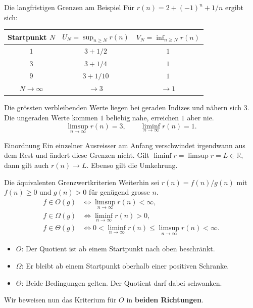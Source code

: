 \begin{frame}{Die langfristigen Grenzen am Beispiel}
	Für $r(n)=2+(-1)^n+1/n$ ergibt sich:
	\begin{center}
		\begin{tabular}{c|c|c}
			Startpunkt $N$ & $U_N=\sup_{n\geq N}r(n)$ & $V_N=\inf_{n\geq N}r(n)$\\
			\hline
			$1$ & $3+1/2$ & $1$\\
			$3$ & $3+1/4$ & $1$\\
			$9$ & $3+1/10$ & $1$\\
			$N\to\infty$ & $\longrightarrow 3$ & $\longrightarrow 1$
		\end{tabular}
	\end{center}
	\smallskip
	Die grössten verbleibenden Werte liegen bei geraden Indizes und nähern sich $3$. Die ungeraden Werte kommen $1$ beliebig nahe, erreichen $1$ aber nie.
	\[
		\limsup_{n\to\infty}r(n)=3,\qquad \liminf_{n\to\infty}r(n)=1.
	\]
	\begin{block}{Einordnung}
		Ein einzelner Ausreisser am Anfang verschwindet irgendwann aus dem Rest und ändert diese Grenzen nicht. Gilt $\liminf r=\limsup r=L\in\mathbb{R}$, dann gilt auch $r(n)\to L$. Ebenso gilt die Umkehrung.
	\end{block}
\end{frame}

\begin{frame}{Die äquivalenten Grenzwertkriterien}
	Weiterhin sei $r(n)=f(n)/g(n)$ mit $f(n)\geq 0$ und $g(n)>0$ für genügend grosse $n$.
	\begin{align*}
		f\in O(g) &\iff \limsup_{n\to\infty}r(n)<\infty,\\[0.5em]
		f\in\Omega(g) &\iff \liminf_{n\to\infty}r(n)>0,\\[0.5em]
		f\in\Theta(g) &\iff 0<\liminf_{n\to\infty}r(n)
		\leq\limsup_{n\to\infty}r(n)<\infty.
	\end{align*}
	\begin{itemize}
		\item $O$: Der Quotient ist ab einem Startpunkt nach oben beschränkt.
		\item $\Omega$: Er bleibt ab einem Startpunkt oberhalb einer positiven Schranke.
		\item $\Theta$: Beide Bedingungen gelten. Der Quotient darf dabei schwanken.
	\end{itemize}
	Wir beweisen nun das Kriterium für $O$ in \textbf{beiden Richtungen}.
\end{frame}

